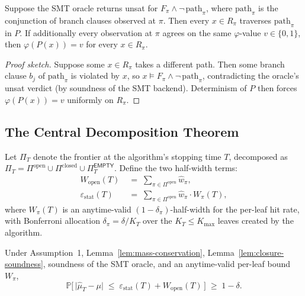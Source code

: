 \documentclass[runningheads]{llncs}
\newcommand{\prog}{P}
\newcommand{\prop}{\varphi}
\newcommand{\mutrue}{\mu}
\newcommand{\muhat}{\hat{\mu}}
\newcommand{\partset}{\Pi}
\newcommand{\openleaves}{\partset^{\mathrm{open}}}
\newcommand{\closedleaves}{\partset^{\mathrm{closed}}}
\newcommand{\Wopen}{W_{\mathrm{open}}}
\newcommand{\epsstat}{\varepsilon_{\mathrm{stat}}}
\newcommand{\hwhat}{\hat{w}}
\newcommand{\unsat}{\textsf{unsat}}
\begin{document}
\begin{lemma}\label{lem:closure-soundness}
  Suppose the SMT oracle returns \unsat{} for
  $F_\pi \wedge \neg\,\mathrm{path}_\pi$, where
  $\mathrm{path}_\pi$ is the conjunction of branch clauses observed
  at $\pi$.  Then every $x \in R_\pi$ traverses
  $\mathrm{path}_\pi$ in $\prog$.  If additionally every
  observation at $\pi$ agrees on the same $\prop$-value
  $v \in \{0,1\}$, then $\prop(\prog(x)) = v$ for every
  $x \in R_\pi$.
\end{lemma}

\begin{proof}[Proof sketch]
  Suppose some $x \in R_\pi$ takes a different path.  Then some
  branch clause $b_j$ of $\mathrm{path}_\pi$ is violated by $x$,
  so $x \models F_\pi \wedge \neg\,\mathrm{path}_\pi$, contradicting
  the oracle's \unsat{} verdict (by soundness of the SMT backend).
  Determinism of $\prog$ then forces $\prop(\prog(x)) = v$ uniformly
  on $R_\pi$.
\end{proof}

\subsection{The Central Decomposition Theorem}\label{sec:hw-decomp}

Let $\Pi_T$ denote the frontier at the algorithm's stopping time $T$,
decomposed as
$\Pi_T = \openleaves \cup \closedleaves \cup \Pi^{\mathsf{EMPTY}}_T$.
Define the two half-width terms:
\begin{align}
  \Wopen(T) \;&=\; \sum_{\pi \in \openleaves} \hwhat_\pi,\\
  \epsstat(T) \;&=\; \sum_{\pi \in \openleaves}
    \hwhat_\pi \cdot W_\pi(T),
\end{align}
where $W_\pi(T)$ is an anytime-valid $(1-\delta_\pi)$-half-width for
the per-leaf hit rate, with Bonferroni allocation
$\delta_\pi = \delta / K_T$ over the $K_T \le K_{\max}$ leaves
created by the algorithm.

\begin{theorem}%
  \label{thm:hw-decomp}
  Under Assumption~1, Lemma~\ref{lem:mass-conservation},
  Lemma~\ref{lem:closure-soundness}, soundness of the SMT oracle, and
  an anytime-valid per-leaf bound $W_\pi$,
  \begin{equation}
    \mathbb{P}\!\Big[\,\big|\muhat_T - \mutrue\big|
      \;\le\; \epsstat(T) + \Wopen(T)\,\Big]
    \;\ge\; 1 - \delta.
  \end{equation}
\end{theorem}
\end{document}
